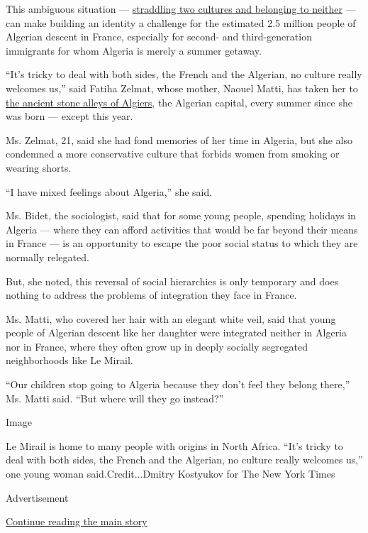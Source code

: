 This ambiguous situation ---
\href{https://www.nytimes3xbfgragh.onion/2015/08/16/world/africa/france-algeria-immigration-discrimination-racism.html}{straddling
two cultures and belonging to neither} --- can make building an identity
a challenge for the estimated 2.5 million people of Algerian descent in
France, especially for second- and third-generation immigrants for whom
Algeria is merely a summer getaway.

``It's tricky to deal with both sides, the French and the Algerian, no
culture really welcomes us,'' said Fatiha Zelmat, whose mother, Naouel
Matti, has taken her to
\href{https://www.nytimes3xbfgragh.onion/2019/05/05/world/africa/algeria-casbah-preservation-plan.html}{the
ancient stone alleys of Algiers}, the Algerian capital, every summer
since she was born --- except this year.

Ms. Zelmat, 21, said she had fond memories of her time in Algeria, but
she also condemned a more conservative culture that forbids women from
smoking or wearing shorts.

``I have mixed feelings about Algeria,'' she said.

Ms. Bidet, the sociologist, said that for some young people, spending
holidays in Algeria --- where they can afford activities that would be
far beyond their means in France --- is an opportunity to escape the
poor social status to which they are normally relegated.

But, she noted, this reversal of social hierarchies is only temporary
and does nothing to address the problems of integration they face in
France.

Ms. Matti, who covered her hair with an elegant white veil, said that
young people of Algerian descent like her daughter were integrated
neither in Algeria nor in France, where they often grow up in deeply
socially segregated neighborhoods like Le Mirail.

``Our children stop going to Algeria because they don't feel they belong
there,'' Ms. Matti said. ``But where will they go instead?''

Image

Le Mirail is home to many people with origins in North Africa. ``It's
tricky to deal with both sides, the French and the Algerian, no culture
really welcomes us,'' one young woman said.Credit...Dmitry Kostyukov for
The New York Times

Advertisement

\protect\hyperlink{after-bottom}{Continue reading the main story}

